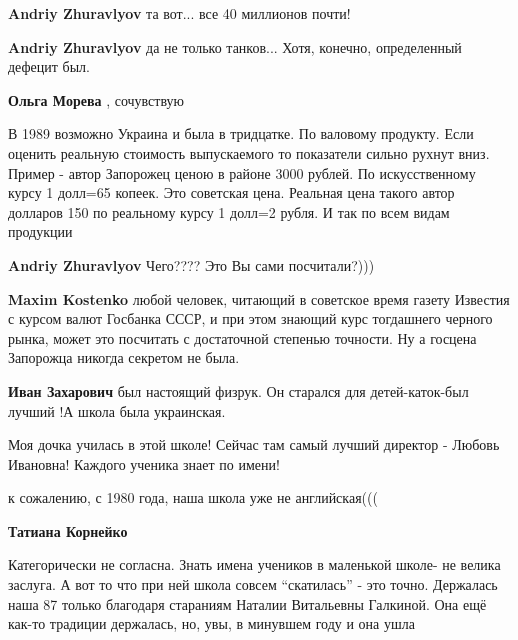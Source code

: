 \begin{itemize}
\begin{itemize}
\begin{itemize}
\textbf{Andriy Zhuravlyov} та вот... все 40 миллионов почти!

\textbf{Andriy Zhuravlyov} да не только танков...
Хотя, конечно, определенный дефецит был.

\end{itemize} %

\textbf{Ольга Морева} , сочувствую


В 1989 возможно Украина и была в тридцатке. По валовому продукту. Если оценить
реальную стоимость выпускаемого то показатели сильно рухнут вниз. Пример -
автор Запорожец ценою в районе 3000 рублей. По искусственному курсу 1 долл=65
копеек. Это советская цена. Реальная цена такого автор долларов 150 по
реальному курсу 1 долл=2 рубля. И так по всем видам продукции

\begin{itemize} %
\textbf{Andriy Zhuravlyov} Чего????
Это Вы сами посчитали?)))

\textbf{Maxim Kostenko} любой человек, читающий в советское время газету Известия с курсом валют Госбанка СССР, и при этом знающий курс тогдашнего черного рынка, может это посчитать с достаточной степенью точности. Ну а госцена Запорожца никогда секретом не была.
\end{itemize} %

\end{itemize} %

\textbf{Иван Захарович} был настоящий физрук. Он старался для детей-каток-был лучший !А школа была украинская.


Моя дочка училась в этой школе! Сейчас там самый лучший директор - Любовь
Ивановна! Каждого ученика знает по имени!

\begin{itemize} %
к сожалению, с 1980 года, наша школа уже не английская(((

\textbf{Татиана Корнейко} 

Категорически не согласна. Знать имена учеников в маленькой школе- не велика
заслуга. А вот то что при ней школа совсем \enquote{скатилась} - это точно. Держалась
наша 87 только благодаря стараниям Наталии Витальевны Галкиной. Она ещё как-то
традиции держалась, но, увы, в минувшем году и она ушла


\end{itemize}
\end{itemize}
